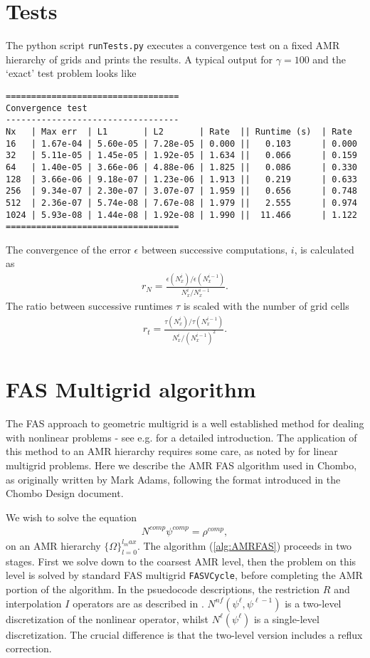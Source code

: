 \documentclass[10pt]{article}
\begin{document}
\section{Tests}
\label{sec:tests}
The python script \texttt{runTests.py} executes a convergence test on a fixed AMR hierarchy of grids and prints the results. A typical output for $\gamma=100$ and the `exact' test problem looks like
\begin{verbatim}
==================================
Convergence test
----------------------------------
Nx   | Max err  | L1       | L2       | Rate  || Runtime (s)  | Rate 
16   | 1.67e-04 | 5.60e-05 | 7.28e-05 | 0.000 ||   0.103      | 0.000
32   | 5.11e-05 | 1.45e-05 | 1.92e-05 | 1.634 ||   0.066      | 0.159
64   | 1.40e-05 | 3.66e-06 | 4.88e-06 | 1.825 ||   0.086      | 0.330
128  | 3.66e-06 | 9.18e-07 | 1.23e-06 | 1.913 ||   0.219      | 0.633
256  | 9.34e-07 | 2.30e-07 | 3.07e-07 | 1.959 ||   0.656      | 0.748
512  | 2.36e-07 | 5.74e-08 | 7.67e-08 | 1.979 ||   2.555      | 0.974
1024 | 5.93e-08 | 1.44e-08 | 1.92e-08 | 1.990 ||  11.466      | 1.122
==================================
\end{verbatim}
The convergence of the error $\epsilon$ between successive computations, $i$, is calculated as
\begin{align}
r_N = \frac{\epsilon(N_x^i)/ \epsilon(N_x^{i-1})}{N_x^i / N_x^{i-1}}.
\end{align}
The ratio between successive runtimes $\tau$ is scaled with the number of grid cells
\begin{align}
r_t = \frac{\tau(N_x^i) / \tau(N_x^{i-1})}{N_x^i / (N_x^{i-1})^2}.
\end{align}



\section{FAS Multigrid algorithm}
\label{sec:algorithm}
The FAS approach to geometric multigrid is a well established method for dealing with nonlinear problems - see e.g. \cite{Briggs2000, Henson2002} for a detailed introduction. The application of this method to an AMR hierarchy requires some care, as noted by \cite{Martin1996, Martin1998} for linear multigrid problems. Here we describe the AMR FAS algorithm used in Chombo, as originally written by Mark Adams, following the format introduced in the Chombo Design document.

We wish to solve the equation
\begin{align}
N^{comp} \psi^{comp} = \rho^{comp},
\end{align}
on an AMR hierarchy $\{ \Omega \}_{l=0}^{l_max}$. The algorithm (\cref{alg:AMRFAS}) proceeds in two stages. First we solve down to the coarsest AMR level, then the problem on this level is solved by standard FAS multigrid \texttt{FASVCycle}, before completing the AMR portion of the algorithm. In the psuedocode descriptions, the restriction $R$ and interpolation $I$ operators are as described in \cite{Chombo}. $N^{nf}(\psi^\ell, \psi^{\ell-1})$ is a two-level discretization of the nonlinear operator, whilst $N^\ell(\psi^\ell)$ is a single-level discretization. The crucial difference is that the two-level version includes a reflux correction.
\end{document}
